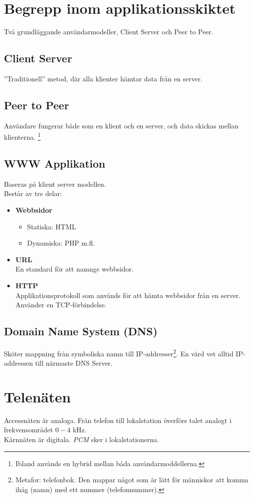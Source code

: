 \documentclass[11pt]{article}
\begin{document}
\section{Begrepp inom applikationsskiktet}
Två grundläggande användarmodeller, Client Server och Peer to Peer.
\subsection*{Client Server}
''Traditionell'' metod, där alla klienter hämtar data från en server.
\subsection*{Peer to Peer}
Användare fungerar både som en klient och en server, och data skickas mellan klienterna. \footnote{Ibland används en hybrid mellan båda användarmoddellerna.}
\subsection{WWW Applikation}
Baseras på klient server modellen. \\
Består av tre delar:
\begin{itemize}
\item{\textbf{Webbsidor} 
	\begin{itemize}
	\item{Statiska: HTML}
	\item{Dynamiska: PHP m.fl.}
	\end{itemize}
	}
\item{\textbf{URL} \\
	En standard för att namnge webbsidor.}
\item{\textbf{HTTP} \\
	Applikationsprotokoll som används för att hämta webbsidor från en server. \\
	Använder en TCP-förbindelse.}
\end{itemize}
\subsection{Domain Name System (DNS)}
Sköter mappning från symboliska namn till IP-addresser\footnote{Metafor: telefonbok. Den mappar något som är lätt för människor att komma ihåg (namn) med ett nummer (telefonnummer).}. En värd vet alltid IP-addressen till närmaste DNS Server. 
\section{Telenäten}
Accessnäten är analoga. Från telefon till lokalstation överförs talet analogt i frekvensområdet $0-4$ kHz. \\
Kärnnäten är digitala. \emph{PCM} sker i lokalstationerna.
\end{document}
